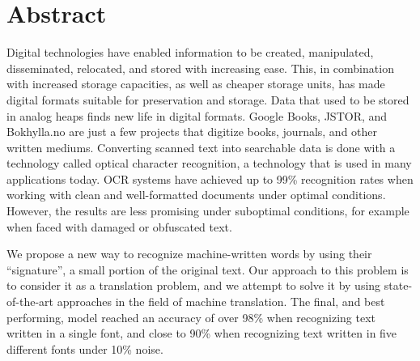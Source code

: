 
\chapter*{Abstract}
Digital technologies have enabled information to be created, manipulated, disseminated, relocated, and stored with increasing ease. This, in combination with increased storage capacities, as well as cheaper storage units, has made digital formats suitable for preservation and storage. Data that used to be stored in analog heaps finds new life in digital formats. Google Books, JSTOR, and Bokhylla.no are just a few projects that digitize books, journals, and other written mediums. Converting scanned text into searchable data is done with a technology called optical character recognition, a technology that is used in many applications today. OCR systems have achieved up to 99\% recognition rates when working with clean and well-formatted documents under optimal conditions. However, the results are less promising under suboptimal conditions, for example when faced with damaged or obfuscated text. \newline

\noindent We propose a new way to recognize machine-written words by using their ``signature'', a small portion of the original text. Our approach to this problem is to consider it as a translation problem, and we attempt to solve it by using state-of-the-art approaches in the field of machine translation. The final, and best performing, model reached an accuracy of over 98\% when recognizing text written in a single font, and close to 90\% when recognizing text written in five different fonts under 10\% noise.